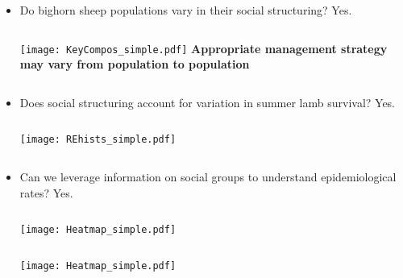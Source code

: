 \documentclass[fleqn,xcolor=table]{beamer}
\begin{document}
{
\begin{frame}[t]
	\begin{itemize}
		\item[] \color{navy} \footnotesize Do bighorn sheep populations vary in their social
			structuring?
			\color{darkred} Yes.
	\begin{columns}
			\texttt{[image: KeyCompos\_simple.pdf]}
			\vspace{.1in}
			\footnotesize \color{darkred} \textbf{Appropriate management
			strategy may vary from population to population}
	\end{columns}
		\item[] \color{navy} \footnotesize Does social structuring account for variation in
			summer lamb survival?
			\color{darkred} Yes.
	\begin{columns}
		\column{.3\textwidth}
			\texttt{[image: REhists\_simple.pdf]}
			\vspace{.1in}
		\column{.7\textwidth}
	\end{columns}

			\vspace{.1in}
		\item[] \color{navy} \footnotesize Can we leverage
				information on social groups to understand 
			epidemiological rates?
			\color{darkred} Yes.

	\begin{columns}
			\texttt{[image: Heatmap\_simple.pdf]}
			\vspace{.1in}
	\end{columns}
			\texttt{[image: Heatmap\_simple.pdf]}
	\end{itemize}
\end{frame}
}
%
\end{document}
